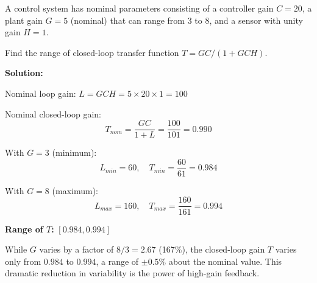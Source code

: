 \begin{example}
\label{ex:gain_variation}
A control system has nominal parameters consisting of a controller gain $C = 20$, a plant gain $G = 5$ (nominal) that can range from $3$ to $8$, and a sensor with unity gain $H = 1$.

Find the range of closed-loop transfer function $T = GC/(1+GCH)$.

\textbf{Solution:}

Nominal loop gain: $L = GCH = 5 \times 20 \times 1 = 100$

Nominal closed-loop gain:
\begin{equation}
T_{nom} = \frac{GC}{1+L} = \frac{100}{101} = 0.990
\end{equation}

With $G = 3$ (minimum):
\begin{equation}
L_{min} = 60, \quad T_{min} = \frac{60}{61} = 0.984
\end{equation}

With $G = 8$ (maximum):
\begin{equation}
L_{max} = 160, \quad T_{max} = \frac{160}{161} = 0.994
\end{equation}

\textbf{Range of $T$:} $[0.984, 0.994]$

While $G$ varies by a factor of $8/3 = 2.67$ (167\%), the closed-loop gain $T$ varies only from $0.984$ to $0.994$, a range of $\pm 0.5\%$ about the nominal value. This dramatic reduction in variability is the power of high-gain feedback.
\end{example}

